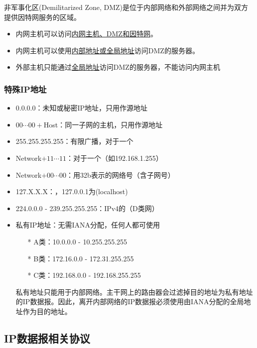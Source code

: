 \myhline
非军事化区(Demilitarized Zone, DMZ)是位于内部网络和外部网络之间并为双方提供因特网服务的区域。
\begin{itemize}
\item 内网主机可以访问\underline{内网主机、DMZ和因特网}。
\item 内网主机可以使用\underline{内部地址或全局地址}访问DMZ的服务器。
\item 外部主机只能通过\underline{全局地址}访问DMZ的服务器，不能访问内网主机
\end{itemize}

\subsubsection{特殊IP地址}
\begin{itemize}
	\item 0.0.0.0：未知或秘密IP地址，只用作源地址
	\item $00\cdots00+$Host：同一子网的主机，只用作源地址
	\item 255.255.255.255：有限广播，对于一个
	\item Network$+11\cdots11$：对于一个（如192.168.1.255）
	\item Network$+00\cdots00$：用32b表示的网络号（含子网号）
	\item 127.X.X.X：，127.0.0.1为(localhost)
	\item 224.0.0.0 - 239.255.255.255：IPv4的（D类网）
	\item 私有IP地址：无需IANA分配，任何人都可使用
	\begin{itemize}
		\item[*] A类：10.0.0.0 - 10.255.255.255
		\item[*] B类：172.16.0.0 - 172.31.255.255
		\item[*] C类：192.168.0.0 - 192.168.255.255
	\end{itemize}
	私有地址只能用于内部网络。主干网上的路由器会过滤掉目的地址为私有地址的IP数据报。因此，离开内部网络的IP数据报必须使用由IANA分配的全局地址作为目的地址。
\end{itemize}

\subsection{IP数据报相关协议}
